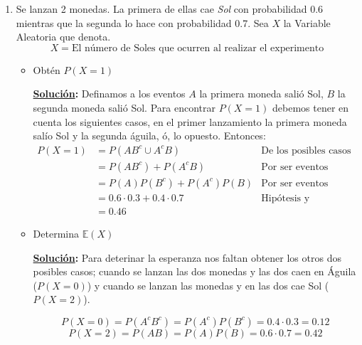 \documentclass[11pt,letterpaper]{report}
\newcommand{\sol}{\textbf{\underline{Solución}: }} %
\begin{document}
\begin{enumerate}
\begin{itemize}
    \item Prueba que $\mathds{E}(X^2) = \infty$.
    \begin{proof}
        Para el segundo momento, se tiene:
        \begin{align*}
            \mathds{E}[X^2]
                &= \sum_{n=1}^{\infty} n^2 P(X = n) = \sum_{n=1}^{\infty} \frac{4n^2}{n(n+1)(n+2)}\\
                &= \sum_{n=1}^{\infty} \frac{4n}{(n+1)(n+2)}
        \end{align*}
        Y eso diverge, por lo tanto $\mathds{E}(X^2) = \infty$.
    \end{proof}
\end{itemize}

\item Se lanzan 2 monedas. La primera de ellas cae \emph{Sol} con probabilidad 0.6 mientras que la
segunda lo hace con probabilidad 0.7. Sea $X$ la Variable Aleatoria que denota.
$$  X = \text{El número de Soles que ocurren al realizar el experimento} $$
\begin{itemize}
    \item Obtén $P(X = 1)$

    \sol Definamos a los eventos $A$ la primera moneda salió Sol, $B$ la segunda moneda salió Sol.
    Para encontrar $P(X = 1)$ debemos tener en cuenta los siguientes casos, en el primer lanzamiento
    la primera moneda salío Sol y la segunda águila, ó, lo opuesto. Entonces:
    \begin{align*}
        P(X=1)
            &= P(AB^c \cup A^cB) & \text{De los posibles casos}\\
            &= P(AB^c) +  P(A^cB) & \text{Por ser eventos disjuntos}\\
            &= P(A)P(B^c) +  P(A^c)P(B) & \text{Por ser eventos independientes}\\
            &= 0.6 \cdot 0.3 +  0.4 \cdot 0.7 & \text{Hipótesis y obteniendo complemento}\\
            &= 0.46
    \end{align*}

    \item Determina $\mathds{E}(X)$
    
    \sol Para deterinar la esperanza nos faltan obtener los otros dos posibles casos; cuando se
    lanzan las dos monedas y las dos caen en Águila ($P(X=0)$) y cuando se lanzan las monedas y en
    las dos cae Sol ($P(X=2)$).

    $$    P(X=0) = P(A^cB^c) = P(A^c)P(B^c) = 0.4 \cdot 0.3 = 0.12    $$
    $$    P(X=2) = P(AB) = P(A)P(B) = 0.6 \cdot 0.7 = 0.42    $$


\end{itemize}
\end{enumerate}
\end{document}
